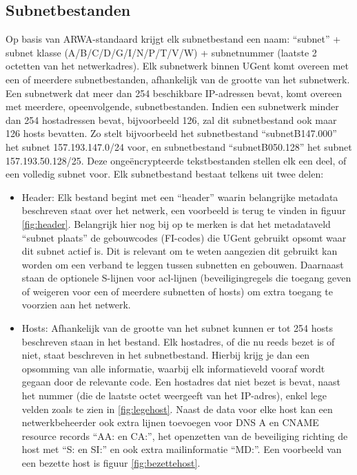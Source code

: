 \subsection{Subnetbestanden}
\label{subnetbestanden}
Op basis van ARWA-standaard krijgt elk subnetbestand een naam: “subnet” + subnet klasse (A/B/C/D/G/I/N/P/T/V/W) + subnetnummer (laatste 2 octetten van het netwerkadres). Elk subnetwerk binnen UGent komt overeen met een of meerdere subnetbestanden, afhankelijk van de grootte van het subnetwerk. Een subnetwerk dat meer dan 254 beschikbare IP-adressen bevat, komt overeen met meerdere, opeenvolgende, subnetbestanden. Indien een subnetwerk minder dan 254 hostadressen bevat, bijvoorbeeld 126, zal dit subnetbestand ook maar 126 hosts bevatten.
Zo stelt bijvoorbeeld het subnetbestand “subnetB147.000” het subnet 157.193.147.0/24 voor, en subnetbestand “subnetB050.128” het subnet 157.193.50.128/25. Deze ongeëncrypteerde tekstbestanden stellen elk een deel, of een volledig subnet voor. Elk subnetbestand bestaat telkens uit twee delen: 
\begin{itemize}
    \item Header: Elk bestand begint met een “header” waarin belangrijke metadata beschreven staat over het netwerk, een voorbeeld is terug te vinden in figuur \ref{fig:header}. Belangrijk hier nog bij op te merken is dat het metadataveld “subnet plaats” de gebouwcodes (FI-codes) die UGent gebruikt opsomt waar dit subnet actief is. Dit is relevant om te weten aangezien dit gebruikt kan worden om een verband te leggen tussen subnetten en gebouwen. Daarnaast staan de optionele S-lijnen voor \acrfull{acl}-lijnen (beveiligingregels die toegang geven of weigeren voor een of meerdere subnetten of hosts) om extra toegang te voorzien aan het netwerk. 
    \item Hosts: Afhankelijk van de grootte van het subnet kunnen er tot 254 hosts beschreven staan in het bestand. Elk hostadres, of die nu reeds bezet is of niet, staat beschreven in het subnetbestand. Hierbij krijg je dan een opsomming van alle informatie, waarbij elk informatieveld vooraf wordt gegaan door de relevante code. Een hostadres dat niet bezet is bevat, naast het nummer (die de laatste octet weergeeft van het IP-adres), enkel lege velden zoals te zien in \ref{fig:legehost}. Naast de data voor elke host kan een netwerkbeheerder ook extra lijnen toevoegen voor DNS A en CNAME resource records “AA: en CA:”, het openzetten van de beveiliging richting de host met “S: en SI:” en ook extra mailinformatie “MD:”. Een voorbeeld van een bezette host is figuur \ref{fig:bezettehost}.
\end{itemize}

